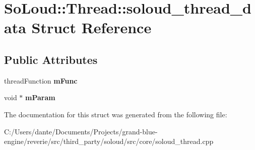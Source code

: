 \hypertarget{struct_so_loud_1_1_thread_1_1soloud__thread__data}{}\section{So\+Loud\+::Thread\+::soloud\+\_\+thread\+\_\+data Struct Reference}
\label{struct_so_loud_1_1_thread_1_1soloud__thread__data}
\subsection*{Public Attributes}
\begin{DoxyCompactItemize}
\item 
\mbox{\label{struct_so_loud_1_1_thread_1_1soloud__thread__data_aa59f2defb3f6ff95e91dfeb4a8fd5fee}} 
thread\+Function {\bfseries m\+Func}
\item 
\mbox{\label{struct_so_loud_1_1_thread_1_1soloud__thread__data_a7080dadf69cae3d89f60f2bcd40d975a}} 
void $\ast$ {\bfseries m\+Param}
\end{DoxyCompactItemize}


The documentation for this struct was generated from the following file\+:\begin{DoxyCompactItemize}
\item 
C\+:/\+Users/dante/\+Documents/\+Projects/grand-\/blue-\/engine/reverie/src/third\+\_\+party/soloud/src/core/soloud\+\_\+thread.\+cpp\end{DoxyCompactItemize}
